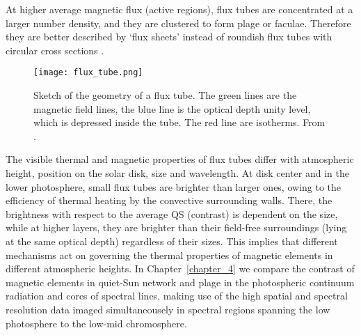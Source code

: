 \documentclass[goettingen, gauss, print]{thesis}
\begin{document}
At higher average magnetic flux (active regions), flux tubes are concentrated at a larger number density, and they are clustered to form plage or faculae. Therefore they are better described by `flux sheets' instead of roundish flux tubes with circular cross sections \citep{yelles_chaouche_comparison_2009}.

\begin{figure}
\centering
\hspace*{-1cm}\texttt{[image: flux\_tube.png]}
\caption{Sketch of the geometry of a flux tube. The green lines are the magnetic field lines, the blue line is the optical depth unity level, which is depressed inside the tube. The red line are isotherms. From \cite{steiner_photospheric_2007}.}
\label{tft}
\end{figure}

The visible thermal and magnetic properties of flux tubes differ with atmospheric height, position on the solar disk, size and wavelength. At disk center and in the lower photosphere, small flux tubes are brighter than larger ones, owing to the efficiency of thermal heating by the convective surrounding walls. There, the brightness with respect to the average QS (contrast) is dependent on the size, while at higher layers, they are brighter than their field-free surroundings (lying at the same optical depth) regardless of their sizes. This implies that different mechanisms act on governing the thermal properties of magnetic elements in different atmospheric heights. In Chapter~\ref{chapter_4} we compare the contrast of magnetic elements in quiet-Sun network and plage in the photospheric continuum radiation and cores of spectral lines, making use of the high spatial and spectral resolution data imaged simultaneousely in spectral regions spanning the low photosphere to the low-mid chromosphere.
\end{document}
